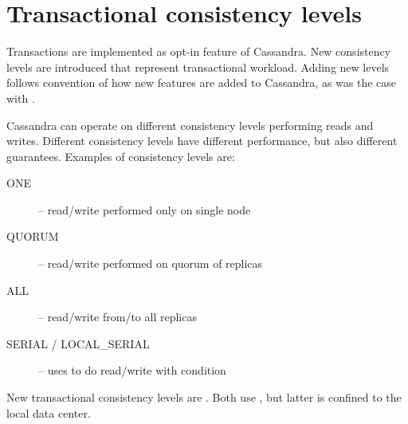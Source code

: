 




\section{Transactional consistency levels}
Transactions are implemented as opt-in feature of Cassandra. New consistency levels  are introduced that represent transactional workload. Adding new levels follows convention of how new features are added to Cassandra, as was the case with \lwt. 
 
Cassandra can operate on different consistency levels performing reads and writes. Different consistency levels have different performance, but also different guarantees. Examples of consistency levels are:
\begin{description}
\item[ONE] -- read/write performed only on single node
\item[QUORUM] -- read/write performed on quorum of replicas
\item[ALL] -- read/write from/to all replicas
\item[SERIAL / LOCAL_SERIAL] -- uses \lwt to do read/write with condition
\end{description}

New transactional consistency levels are . Both use \mpt, but latter is confined to the local data center.

